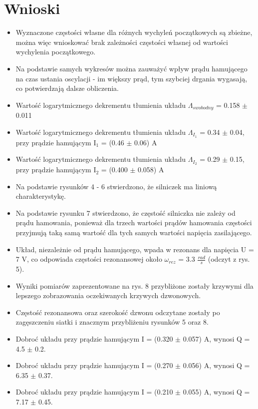 \documentclass[12pt, a4paper, oneside]{article}
\begin{document}
\section{Wnioski}
\begin{itemize}
\item Wyznaczone częstości własne dla różnych wychyleń początkowych są zbieżne, można więc wnioskować brak zależności częstości własnej od wartości wychylenia początkowego.
\item Na podstawie samych wykresów można zauważyć wpływ prądu hamującego na czas ustania oscylacji - im większy prąd, tym szybciej drgania wygasają, co potwierdzają dalsze obliczenia.
\item Wartość logarytmicznego dekrementu tłumienia układu $\Lambda_{swobodny}$ = 0.158 $\pm$ 0.011
\item Wartość logarytmicznego dekrementu tłumienia układu $\Lambda_{I_1}$ = 0.34 $\pm$ 0.04, przy prądzie hamującym I$_1$ = (0.46 $\pm$ 0.06) A
\item Wartość logarytmicznego dekrementu tłumienia układu $\Lambda_{I_2}$ = 0.29 $\pm$ 0.15, przy prądzie hamującym I$_2$ = (0.400 $\pm$ 0.058) A
\item Na podstawie rysunków 4 - 6 stwierdzono, że silniczek ma liniową charakterystykę.
\item Na podstawie rysunku 7 stwierdzono, że częstość silniczka nie zależy od prądu hamowania, ponieważ dla trzech wartości prądów hamowania częstości przyjmują taką samą wartość dla tych samych wartości napięcia zasilającego.
\item Układ, niezależnie od prądu hamującego, wpada w rezonans dla napięcia U = 7 V, co odpowiada częstości rezonansowej około $\omega_{rez}$ = 3.3 $\frac{rad}{s}$ (odczyt z rys. 5).
\item Wyniki pomiarów zaprezentowane na rys. 8 przybliżone zostały krzywymi dla lepszego zobrazowania oczekiwanych krzywych dzwonowych.
\item Częstość rezonansowa oraz szerokość dzwonu odczytane zostały po zagęszczeniu siatki i znacznym przybliżeniu rysunków 5 oraz 8.
\item Dobroć układu przy prądzie hamującym I = (0.320 $\pm$ 0.057) A, wynosi Q = 4.5 $\pm$ 0.2.
\item Dobroć układu przy prądzie hamującym I = (0.270 $\pm$ 0.056) A, wynosi Q = 6.35 $\pm$ 0.37.
\item Dobroć układu przy prądzie hamującym I = (0.210 $\pm$ 0.055) A, wynosi Q = 7.17 $\pm$ 0.45.
\end{itemize}
\end{document}
